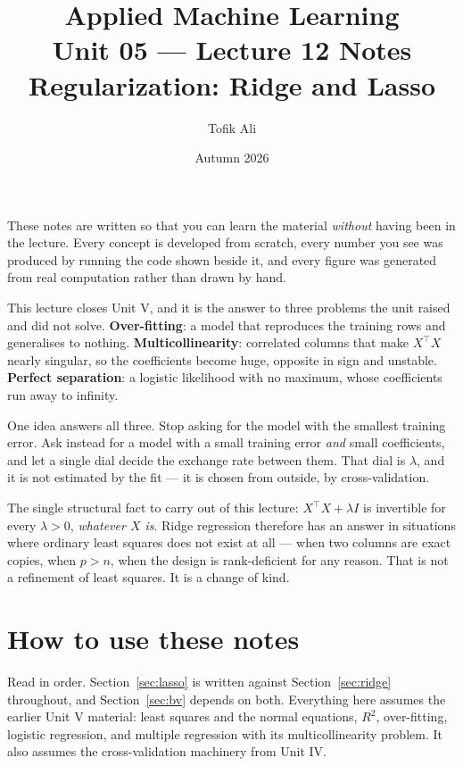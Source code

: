 \documentclass[11pt]{article}
\title{Applied Machine Learning\\Unit 05 --- Lecture 12 Notes\\
       Regularization: Ridge and Lasso}
\author{Tofik Ali}
\date{Autumn 2026}
\newcommand{\XtX}{X^{\!\top}\!X}
\begin{document}
\maketitle

\begin{keyidea}
These notes are written so that you can learn the material \emph{without}
having been in the lecture. Every concept is developed from scratch, every
number you see was produced by running the code shown beside it, and every
figure was generated from real computation rather than drawn by hand.

This lecture closes Unit V, and it is the answer to three problems the unit
raised and did not solve. \textbf{Over-fitting}: a model that reproduces the
training rows and generalises to nothing. \textbf{Multicollinearity}:
correlated columns that make $\XtX$ nearly singular, so the coefficients
become huge, opposite in sign and unstable. \textbf{Perfect separation}: a
logistic likelihood with no maximum, whose coefficients run away to infinity.

One idea answers all three. Stop asking for the model with the smallest
training error. Ask instead for a model with a small training error
\emph{and} small coefficients, and let a single dial decide the exchange rate
between them. That dial is $\lambda$, and it is not estimated by the fit --- it
is chosen from outside, by cross-validation.

The single structural fact to carry out of this lecture:
$\XtX + \lambda I$ is invertible for every $\lambda > 0$, \emph{whatever $X$
is}. Ridge regression therefore has an answer in situations where ordinary
least squares does not exist at all --- when two columns are exact copies,
when $p > n$, when the design is rank-deficient for any reason. That is not a
refinement of least squares. It is a change of kind.
\end{keyidea}

\tableofcontents
\medskip

\section{How to use these notes}
\label{sec:how}

Read in order. Section~\ref{sec:lasso} is written against
Section~\ref{sec:ridge} throughout, and Section~\ref{sec:bv} depends on both.
Everything here assumes the earlier Unit V material: least squares and the
normal equations, $R^2$, over-fitting, logistic regression, and multiple
regression with its multicollinearity problem. It also assumes the
cross-validation machinery from Unit IV.
\end{document}
